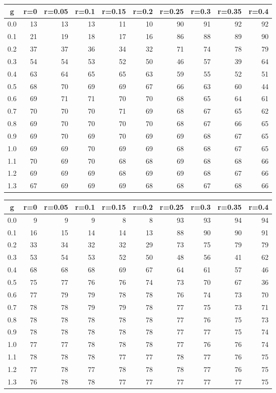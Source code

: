 %
\begin{table}[!tbp]
 \begin{center}
 \begin{tabular}{rrrrrrrrrr}\hline\hline
\multicolumn{1}{c}{g}&\multicolumn{1}{c}{r=0}&\multicolumn{1}{c}{r=0.05}&\multicolumn{1}{c}{r=0.1}&\multicolumn{1}{c}{r=0.15}&\multicolumn{1}{c}{r=0.2}&\multicolumn{1}{c}{r=0.25}&\multicolumn{1}{c}{r=0.3}&\multicolumn{1}{c}{r=0.35}&\multicolumn{1}{c}{r=0.4}\tabularnewline
\hline
0.0&13&13&13&11&10&90&91&92&92\tabularnewline
0.1&21&19&18&17&16&86&88&89&90\tabularnewline
0.2&37&37&36&34&32&71&74&78&79\tabularnewline
0.3&54&54&53&52&50&46&57&39&64\tabularnewline
0.4&63&64&65&65&63&59&55&52&51\tabularnewline
0.5&68&70&69&69&67&66&63&60&44\tabularnewline
0.6&69&71&71&70&70&68&65&64&61\tabularnewline
0.7&70&70&70&71&69&68&67&65&62\tabularnewline
0.8&69&70&70&70&70&68&67&66&65\tabularnewline
0.9&69&70&69&70&69&69&68&67&65\tabularnewline
1.0&69&69&70&69&69&68&68&67&65\tabularnewline
1.1&70&69&70&68&68&69&68&68&66\tabularnewline
1.2&69&69&69&68&69&69&68&67&66\tabularnewline
1.3&67&69&69&69&68&68&67&68&66\tabularnewline
\hline
\end{tabular}

\end{center}

\end{table}

%
\begin{table}[!tbp]
 \begin{center}
 \begin{tabular}{rrrrrrrrrr}\hline\hline
\multicolumn{1}{c}{g}&\multicolumn{1}{c}{r=0}&\multicolumn{1}{c}{r=0.05}&\multicolumn{1}{c}{r=0.1}&\multicolumn{1}{c}{r=0.15}&\multicolumn{1}{c}{r=0.2}&\multicolumn{1}{c}{r=0.25}&\multicolumn{1}{c}{r=0.3}&\multicolumn{1}{c}{r=0.35}&\multicolumn{1}{c}{r=0.4}\tabularnewline
\hline
0.0& 9& 9& 9& 8& 8&93&93&94&94\tabularnewline
0.1&16&15&14&14&13&88&90&90&91\tabularnewline
0.2&33&34&32&32&29&73&75&79&79\tabularnewline
0.3&53&54&53&52&50&48&56&41&62\tabularnewline
0.4&68&68&68&69&67&64&61&57&46\tabularnewline
0.5&75&77&76&76&74&73&70&67&36\tabularnewline
0.6&77&79&79&78&78&76&74&73&70\tabularnewline
0.7&78&78&79&79&78&77&75&73&71\tabularnewline
0.8&78&78&78&78&78&77&76&75&73\tabularnewline
0.9&78&78&78&78&78&77&77&75&74\tabularnewline
1.0&77&77&78&78&78&77&76&76&74\tabularnewline
1.1&78&78&78&77&77&78&77&76&75\tabularnewline
1.2&77&78&77&78&78&78&77&76&75\tabularnewline
1.3&76&78&78&77&77&77&77&77&75\tabularnewline
\hline
\end{tabular}

\end{center}

\end{table}

